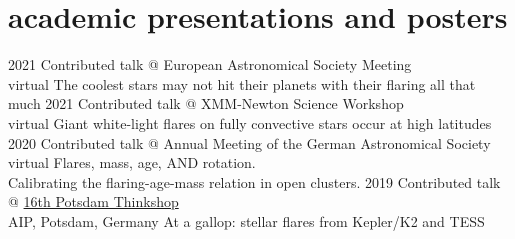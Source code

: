 \documentclass[]{k-cv} %
\begin{document}
\section{academic presentations and posters}

\begin{entrylist}
\entry
{2021}
{Contributed talk @ European Astronomical Society Meeting}
{\\ virtual}
{The coolest stars may not hit their planets with their flaring all that much}
\entry
{2021}
{Contributed talk @ XMM-Newton Science Workshop}
{\\ virtual}
{Giant white-light flares on fully convective stars occur at high latitudes}
\entry
{2020}
{Contributed talk @ Annual Meeting of the German Astronomical Society}
{\\ virtual}
{Flares, mass, age, AND rotation.\\Calibrating the flaring-age-mass relation in open clusters.}
\entry
{2019}
{Contributed talk @ \href{https://thinkshop.aip.de/16/cms/} {16th Potsdam Thinkshop}}
{\\AIP, Potsdam, Germany}
{At a gallop: stellar flares from Kepler/K2 and TESS}

\end{entrylist}
\end{document}
